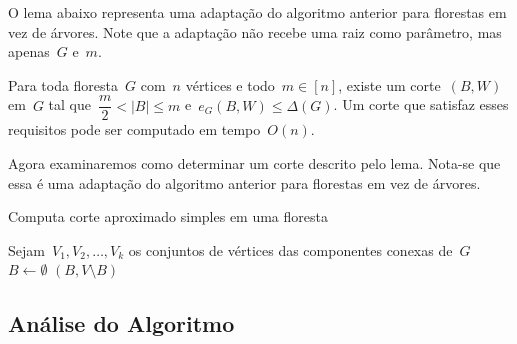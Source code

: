 \bigskip
\bigskip
\bigskip



O lema abaixo representa uma adaptação do algoritmo anterior
para florestas em vez de árvores.
Note que a adaptação não recebe uma raiz como parâmetro, mas 
apenas~$G$ e~$m$.

\begin{lem}
\label{lema:simpleApproxCutForest}
	Para toda floresta~$G$ com~$n$ vértices e todo~${m \in [n]}$,
	existe um corte~$(B,W)$ em~$G$ tal 
	que~${\dfrac{m}{2} <|B| \le m}$ e~${e_G(B,W) \le \Delta(G)}$.
	Um corte que satisfaz esses requisitos pode ser computado em
	tempo~$O(n)$.
\end{lem}

\bigskip

Agora examinaremos como determinar um corte descrito pelo lema.
Nota-se que essa é uma adaptação do algoritmo anterior
para florestas em vez de árvores.

\medskip
\medskip

\begin{algorithm}[H]
\label{alg:simpleApproxCutForest}

	\caption{Computa corte aproximado simples em uma floresta}
	Sejam~$V_1, V_2,\ldots, V_k$ os conjuntos de vértices das
	componentes conexas de~$G$\;
	$B \gets \emptyset$\;
	\Return $(B,V\setminus B)$\;

\end{algorithm}	

\bigskip

\subsection*{Análise do Algoritmo}

